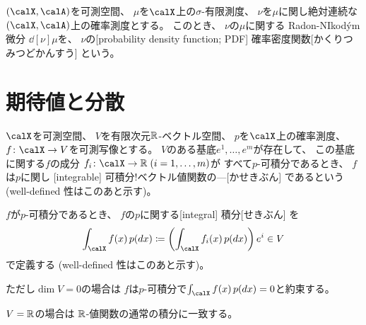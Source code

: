 \documentclass[report]{jlreq}
\begin{document}
\begin{definition}[確率密度関数]
    $(\calX, \calA)$を可測空間、
    $\mu$を$\calX$上の$\sigma$-有限測度、
    $\nu$を$\mu$に関し絶対連続な$(\calX, \calA)$上の確率測度とする。
    このとき、
    $\nu$の$\mu$に関する Radon-NIkod\'ym 微分
    $\dd[\nu]{\mu}$を、
    $\nu$の[probability density function; PDF]
        {確率密度関数}[かくりつみつどかんすう]
    という。
\end{definition}

%
\section{期待値と分散}

\begin{definition}[ベクトル値関数の積分]
    $\calX$を可測空間、
    $V$を有限次元$\mathbb{R}$-ベクトル空間、
    $p$を$\calX$上の確率測度、
    $f \colon \calX \to V$を可測写像とする。
    $V$のある基底$e^1, \dots, e^m$が存在して、
    この基底に関する$f$の成分
    $f_i \colon \calX \to \R \; (i = 1, \dots, m)$が
    すべて$p$-可積分であるとき、
    $f$は$p$に関し
    [integrable]
        {可積分!ベクトル値関数の---}[かせきぶん]
    であるという
    (well-defined 性はこのあと示す)。

    $f$が$p$-可積分であるとき、
    $f$の$p$に関する[integral]
        {積分}[せきぶん]
    を
    \begin{equation}
        \int_\calX f(x) \, p(dx)
            \coloneqq \myparen{
                \int_\calX f_i(x) \, p(dx)
            } e^i
            \in V
    \end{equation}
    で定義する
    (well-defined 性はこのあと示す)。

    ただし$\dim V = 0$の場合は
    $f$は$p$-可積分で$\int_\calX f(x) \, p(dx) = 0$と約束する。
\end{definition}

\begin{remark}
    $V = \mathbb{R}$の場合は
    $\mathbb{R}$-値関数の通常の積分に一致する。
\end{remark}
\end{document}
